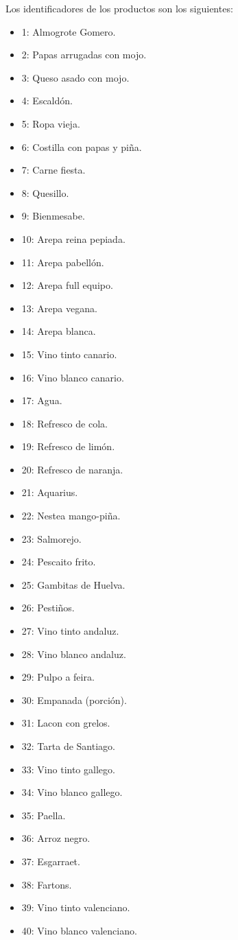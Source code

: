 \documentclass[11pt]{opticajnl}
\begin{document}
\noindent Los identificadores de los productos son los siguientes:
\begin{multicols}{3}
\begin{itemize}
\item 1: Almogrote Gomero.
\item 2: Papas arrugadas con mojo.
\item 3: Queso asado con mojo.
\item 4: Escaldón.
\item 5: Ropa vieja.
\item 6: Costilla con papas y piña.
\item 7: Carne fiesta.
\item 8: Quesillo.
\item 9: Bienmesabe.
\item 10: Arepa reina pepiada.
\item 11: Arepa pabellón.
\item 12: Arepa full equipo.
\item 13: Arepa vegana.
\item 14: Arepa blanca.
\item 15: Vino tinto canario.
\item 16: Vino blanco canario.
\item 17: Agua.
\item 18: Refresco de cola.
\item 19: Refresco de limón.
\item 20: Refresco de naranja.
\item 21: Aquarius.
\item 22: Nestea mango-piña.
\item 23: Salmorejo.
\item 24: Pescaito frito.
\item 25: Gambitas de Huelva.
\item 26: Pestiños.
\item 27: Vino tinto andaluz.
\item 28: Vino blanco andaluz.
\item 29: Pulpo a feira.
\item 30: Empanada (porción).
\item 31: Lacon con grelos.
\item 32: Tarta de Santiago.
\item 33: Vino tinto gallego.
\item 34: Vino blanco gallego.
\item 35: Paella.
\item 36: Arroz negro.
\item 37: Esgarraet. 
\item 38: Fartons. 
\item 39: Vino tinto valenciano.
\item 40: Vino blanco valenciano.
\end{itemize}
\end{multicols}
\end{document}
